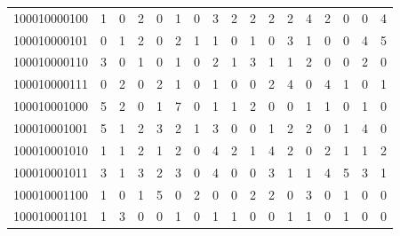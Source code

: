 \documentclass[10pt,a4paper]{article}
\begin{document}
\begin{longtable}{ |c|c|c|c|c|c|c|c|c|c|c|c|c|c|c|c|c| }
    100010000100              & 1                            & 0                                & 2                            & 0                              & 1   & 0   & 3   & 2   & 2   & 2   & 2   & 4   & 2   & 0   & 0   & 4   \\
    100010000101              & 0                            & 1                                & 2                            & 0                              & 2   & 1   & 1   & 0   & 1   & 0   & 3   & 1   & 0   & 0   & 4   & 5   \\
    100010000110              & 3                            & 0                                & 1                            & 0                              & 1   & 0   & 2   & 1   & 3   & 1   & 1   & 2   & 0   & 0   & 2   & 0   \\
    100010000111              & 0                            & 2                                & 0                            & 2                              & 1   & 0   & 1   & 0   & 0   & 2   & 4   & 0   & 4   & 1   & 0   & 1   \\
    100010001000              & 5                            & 2                                & 0                            & 1                              & 7   & 0   & 1   & 1   & 2   & 0   & 0   & 1   & 1   & 0   & 1   & 0   \\
    100010001001              & 5                            & 1                                & 2                            & 3                              & 2   & 1   & 3   & 0   & 0   & 1   & 2   & 2   & 0   & 1   & 4   & 0   \\
    100010001010              & 1                            & 1                                & 2                            & 1                              & 2   & 0   & 4   & 2   & 1   & 4   & 2   & 0   & 2   & 1   & 1   & 2   \\
    100010001011              & 3                            & 1                                & 3                            & 2                              & 3   & 0   & 4   & 0   & 0   & 3   & 1   & 1   & 4   & 5   & 3   & 1   \\
    100010001100              & 1                            & 0                                & 1                            & 5                              & 0   & 2   & 0   & 0   & 2   & 2   & 0   & 3   & 0   & 1   & 0   & 0   \\
    100010001101              & 1                            & 3                                & 0                            & 0                              & 1   & 0   & 1   & 1   & 0   & 0   & 1   & 1   & 0   & 1   & 0   & 0   \\

\end{longtable}
\end{document}
